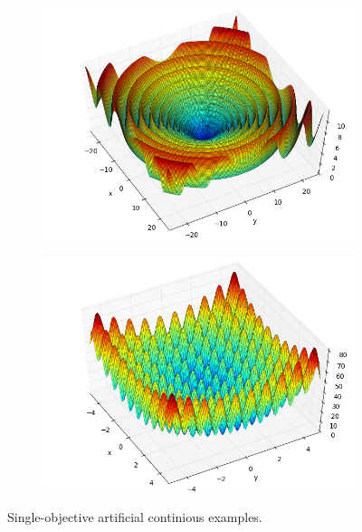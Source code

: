 \documentclass[11pt, runningheads,a4paper]{llncs}
\begin{document}
\begin{figure}
        \centering
        \begin{subfigure}[b]{0.35 \textwidth}
                \centering
                \includegraphics[width=\textwidth]{./figs/schaffer.png}
        \end{subfigure}
        \begin{subfigure}[b]{0.35 \textwidth}
                \centering
                \includegraphics[width=\textwidth]{./figs/rastrigin.png}
        \end{subfigure}
        \caption{Single-objective artificial continious examples.}\label{fig:fitexample}
\end{figure}
\end{document}
